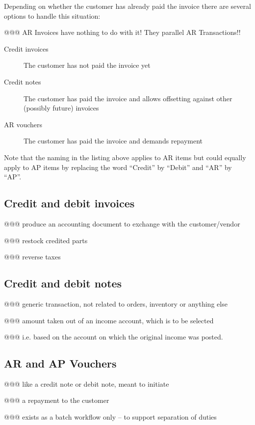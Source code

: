 Depending on whether the customer has already paid the invoice there are several
options to handle this situation:

@@@ AR Invoices have nothing to do with it! They parallel AR Transactions!!

\begin{description}
\item [Credit invoices] The \gls{customer} has not paid the invoice yet
\item [Credit notes] The customer has paid the invoice and allows offsetting against
   other (possibly future) invoices
\item[AR vouchers] The customer has paid the invoice and demands repayment
\end{description}

Note that the naming in the listing above applies to AR items but could equally apply
to AP items by replacing the word ``Credit'' by ``Debit'' and ``AR'' by ``AP''.



\subsection{Credit and debit invoices}

@@@ produce an accounting document to exchange with the customer/vendor

@@@ restock credited parts

@@@ reverse taxes

\subsection{Credit and debit notes}

@@@ generic transaction, not related to orders, inventory or anything else

@@@ amount taken out of an income account, which is to be selected

@@@ i.e. based on the account on which the original income was posted.

\subsection{AR and AP Vouchers}

@@@ like a credit note or debit note, meant to initiate

@@@ a repayment to the customer

@@@ exists as a batch workflow only -- to support separation of duties


